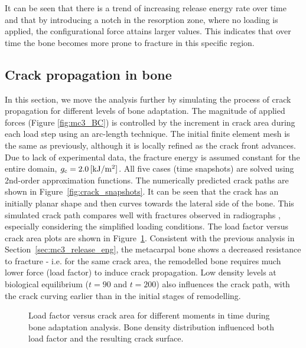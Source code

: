 \documentclass[twocolumn]{svjour3}
\begin{document}
It can be seen that there is a trend of increasing release energy rate over time and that by introducing a notch in the resorption zone, where no loading is applied, the configurational force attains larger values. This indicates that over time the bone becomes more prone to fracture in this specific region. 

\subsection{Crack propagation in bone}
In this section, we move the analysis further by simulating the process of crack propagation for different levels of bone adaptation. The magnitude of applied forces (Figure \ref{fig:mc3_BC}) is controlled by the increment in crack area during each load step using an arc-length technique. The initial finite element mesh is the same as previously, although it is locally refined as the crack front advances. Due to lack of experimental data, the fracture energy is assumed constant for the entire domain, $g_{\text c} = 2.0\,[\mathrm{ kJ/m^2}]$. 
All five cases (time snapshots) are solved using 2nd-order approximation functions.
The numerically predicted crack paths are shown in Figure~\ref{fig:crack_snapshots}. 
It can be seen that the crack has an initially planar shape and then curves towards the lateral side of the bone. This simulated crack path compares well with fractures observed in radiographs \cite{whitton2010third}, especially considering the simplified loading conditions. The load factor versus crack area plots are shown in Figure~\ref{fig:crack_remodel_frac_compar}. Consistent with the previous analysis in Section~\ref{sec:mc3_release_eng}, the metacarpal bone shows a decreased resistance to fracture - i.e. for the same crack area, the remodelled bone requires much lower force (load factor) to induce crack propagation. Low density levels at biological equilibrium ($t=90$ and $t=200$) also influences the crack path, with the crack curving earlier than in the initial stages of remodelling. 
\begin{figure}[h!]
	\centering
	\caption{Load factor versus crack area for different moments in time during bone adaptation analysis. Bone density distribution influenced both load factor and the resulting crack surface.}
	\label{fig:crack_remodel_frac_compar}
\end{figure}
\end{document}
